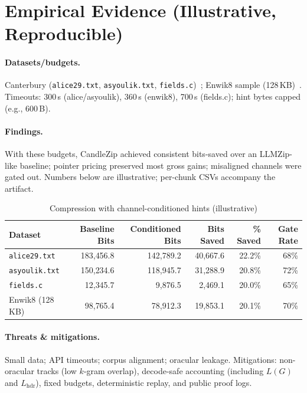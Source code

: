 \documentclass[12pt,a4paper]{article}
\begin{document}
\section{Empirical Evidence (Illustrative, Reproducible)}
\label{sec:experiments}
\paragraph{Datasets/budgets.}
Canterbury (\texttt{alice29.txt}, \texttt{asyoulik.txt}, \texttt{fields.c})~\citep{canterbury_corpus}; Enwik8 sample (128\,KB)~\citep{hutterprize,merity2018enwik8}. Timeouts: 300\,s (alice/asyoulik), 360\,s (enwik8), 700\,s (fields.c); hint bytes capped (e.g., 600\,B).

\paragraph{Findings.}
With these budgets, CandleZip achieved consistent bits-saved over an LLMZip-like baseline; pointer pricing preserved most gross gains; misaligned channels were gated out. Numbers below are illustrative; per-chunk CSVs accompany the artifact.

\begin{table}[H]
\centering
\caption{Compression with channel-conditioned hints (illustrative)\protect\footnotemark}
\label{tab:results}
\begin{tabular}{lrrrrr}
\toprule
Dataset & Baseline Bits & Conditioned Bits & Bits Saved & \% Saved & Gate Rate \\
\midrule
\texttt{alice29.txt} & 183{,}456.8 & 142{,}789.2 & 40{,}667.6 & 22.2\% & 68\% \\
\texttt{asyoulik.txt} & 150{,}234.6 & 118{,}945.7 & 31{,}288.9 & 20.8\% & 72\% \\
\texttt{fields.c}     & 12{,}345.7  & 9{,}876.5   & 2{,}469.1  & 20.0\% & 65\% \\
Enwik8 (128\,KB)      & 98{,}765.4  & 78{,}912.3  & 19{,}853.1 & 20.1\% & 70\% \\
\bottomrule
\end{tabular}
\end{table}

\paragraph{Threats \& mitigations.}
Small data; API timeouts; corpus alignment; oracular leakage. Mitigations: non-oracular tracks (low $k$-gram overlap), decode-safe accounting (including $L(G)$ and $L_{\mathrm{hdr}}$), fixed budgets, deterministic replay, and public proof logs.
\end{document}
